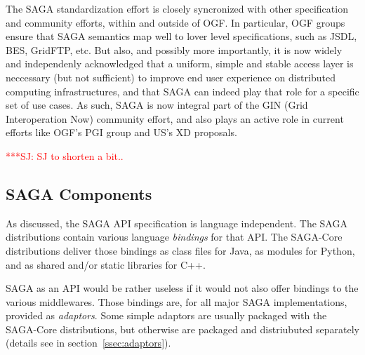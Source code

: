 \documentclass[12pt]{article}
\newcommand{\jhanote}[1]{ {\textcolor{red}     {***SJ: #1}}}
\newcommand{\jhanote}[1]{}
\newcommand{\I}[1]{\textit{#1}}
\begin{document}
  The SAGA standardization effort is closely syncronized with other
  specification and community efforts, within and outside of OGF.  In
  particular, OGF groups ensure that SAGA semantics map well to lover
  level specifications, such as JSDL, BES, GridFTP, etc.   But also, 
  and possibly more importantly, it is now widely and independenly
  acknowledged that a uniform, simple and stable access layer is
  neccessary (but not sufficient) to improve end user experience on
  distributed computing infrastructures, and that SAGA can indeed play
  that role for a specific set of use cases.  As such, SAGA is now
  integral part of the GIN (Grid Interoperation Now) community effort,
  and also plays an active role in current efforts like OGF's PGI
  group and US's XD proposals.
  
  
  

  \jhanote{SJ to shorten a bit..}


 \subsection{SAGA Components}

  As discussed, the SAGA API specification is language independent.
  The SAGA distributions contain various language \I{bindings} for
  that API.  The SAGA-Core distributions deliver those bindings as
  class  files for Java, as modules for Python, and as shared and/or
  static libraries for C++.

  SAGA as an API would be rather useless if it would not also offer
  bindings to the various middlewares.  Those bindings are, for all
  major SAGA implementations, provided as \I{adaptors}.  Some simple
  adaptors are usually packaged with the SAGA-Core distributions, but
  otherwise are packaged and distriubuted separately (details see in
  section~\ref{ssec:adaptors}).
\end{document}
